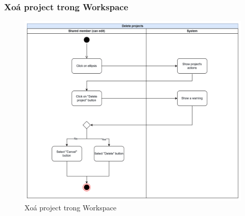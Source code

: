 \subsubsection{Xoá project trong Workspace}
    \begin{figure}[H]
        \centering
        \includegraphics[width=\linewidth]{Content/Phân tích và thiết kế hệ thống/documents/Sơ đồ hoạt động/images/deleteProjects.png}
        \vspace{0.5cm}
        \caption{Xoá project trong Workspace}
        \label{fig:Xoá project trong Workspace}
    \end{figure}